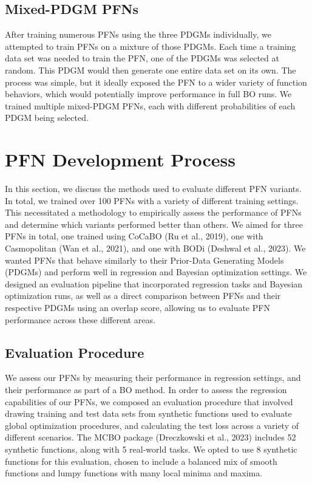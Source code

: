 \documentclass[12pt,twoside]{reedthesis}
\begin{document}
\hypertarget{mixed-pdgm-pfns}{%
\section{Mixed-PDGM PFNs}\label{mixed-pdgm-pfns}}

After training numerous PFNs using the three PDGMs individually, we attempted to train PFNs on a mixture of those PDGMs. Each time a training data set was needed to train the PFN, one of the PDGMs was selected at random. This PDGM would then generate one entire data set on its own. The process was simple, but it ideally exposed the PFN to a wider variety of function behaviors, which would potentially improve performance in full BO runs. We trained multiple mixed-PDGM PFNs, each with different probabilities of each PDGM being selected.

\hypertarget{methods2}{%
\chapter{PFN Development Process}\label{methods2}}

In this section, we discuss the methods used to evaluate different PFN variants. In total, we trained over 100 PFNs with a variety of different training settings. This necessitated a methodology to empirically assess the performance of PFNs and determine which variants performed better than others. We aimed for three PFNs in total, one trained using CoCaBO (Ru et al., 2019), one with Casmopolitan (Wan et al., 2021), and one with BODi (Deshwal et al., 2023). We wanted PFNs that behave similarly to their Prior-Data Generating Models (PDGMs) and perform well in regression and Bayesian optimization settings. We designed an evaluation pipeline that incorporated regression tasks and Bayesian optimization runs, as well as a direct comparison between PFNs and their respective PDGMs using an overlap score, allowing us to evaluate PFN performance across these different areas.

\hypertarget{evalProcedure}{%
\section{Evaluation Procedure}\label{evalProcedure}}

We assess our PFNs by measuring their performance in regression settings, and their performance as part of a BO method. In order to assess the regression capabilities of our PFNs, we composed an evaluation procedure that involved drawing training and test data sets from synthetic functions used to evaluate global optimization procedures, and calculating the test loss across a variety of different scenarios. The MCBO package (Dreczkowski et al., 2023) includes 52 synthetic functions, along with 5 real-world tasks. We opted to use 8 synthetic functions for this evaluation, chosen to include a balanced mix of smooth functions and lumpy functions with many local minima and maxima.
\end{document}
